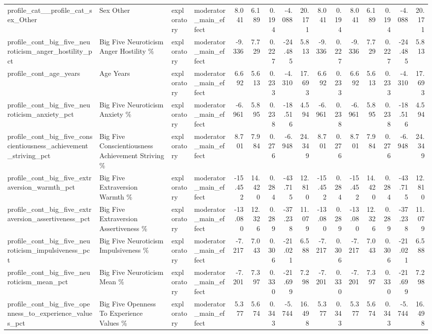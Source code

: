 \begin{table}[htbp]
{{\begin{tabular}{llllrrrrrrrrrrrr}
profile\_cat\_\_profile\_cat\_sex\_Other & Sex Other & exploratory & moderator\_main\_effect & 8.041 & 6.189 & 0.194 & -4.088 & 20.171 & 8.041 & 0.194 & 8.041 & 6.189 & 0.194 & -4.088 & 20.171 \\
profile\_cont\_big\_five\_neuroticism\_anger\_hostility\_pct & Big Five Neuroticism Anger Hostility \% & exploratory & moderator\_main\_effect & -9.336 & 7.729 & 0.227 & -24.485 & 5.813 & -9.336 & 0.227 & -9.336 & 7.729 & 0.227 & -24.485 & 5.813 \\
profile\_cont\_age\_years & Age Years & exploratory & moderator\_main\_effect & 6.692 & 5.613 & 0.233 & -4.310 & 17.693 & 6.692 & 0.233 & 6.692 & 5.613 & 0.233 & -4.310 & 17.693 \\
profile\_cont\_big\_five\_neuroticism\_anxiety\_pct & Big Five Neuroticism Anxiety \% & exploratory & moderator\_main\_effect & -6.961 & 5.895 & 0.238 & -18.516 & 4.594 & -6.961 & 0.238 & -6.961 & 5.895 & 0.238 & -18.516 & 4.594 \\
profile\_cont\_big\_five\_conscientiousness\_achievement\_striving\_pct & Big Five Conscientiousness Achievement Striving \% & exploratory & moderator\_main\_effect & 8.701 & 7.984 & 0.276 & -6.948 & 24.349 & 8.701 & 0.276 & 8.701 & 7.984 & 0.276 & -6.948 & 24.349 \\
profile\_cont\_big\_five\_extraversion\_warmth\_pct & Big Five Extraversion Warmth \% & exploratory & moderator\_main\_effect & -15.452 & 14.420 & 0.284 & -43.715 & 12.810 & -15.452 & 0.284 & -15.452 & 14.420 & 0.284 & -43.715 & 12.810 \\
profile\_cont\_big\_five\_extraversion\_assertiveness\_pct & Big Five Extraversion Assertiveness \% & exploratory & moderator\_main\_effect & -13.080 & 12.326 & 0.289 & -37.238 & 11.079 & -13.080 & 0.289 & -13.080 & 12.326 & 0.289 & -37.238 & 11.079 \\
profile\_cont\_big\_five\_neuroticism\_impulsiveness\_pct & Big Five Neuroticism Impulsiveness \% & exploratory & moderator\_main\_effect & -7.217 & 7.043 & 0.306 & -21.021 & 6.588 & -7.217 & 0.306 & -7.217 & 7.043 & 0.306 & -21.021 & 6.588 \\
profile\_cont\_big\_five\_neuroticism\_mean\_pct & Big Five Neuroticism Mean \% & exploratory & moderator\_main\_effect & -7.201 & 7.397 & 0.330 & -21.699 & 7.298 & -7.201 & 0.330 & -7.201 & 7.397 & 0.330 & -21.699 & 7.298 \\
profile\_cont\_big\_five\_openness\_to\_experience\_values\_pct & Big Five Openness To Experience Values \% & exploratory & moderator\_main\_effect & 5.377 & 5.674 & 0.343 & -5.744 & 16.498 & 5.377 & 0.343 & 5.377 & 5.674 & 0.343 & -5.744 & 16.498 \\

\end{tabular}}}
\end{table}
